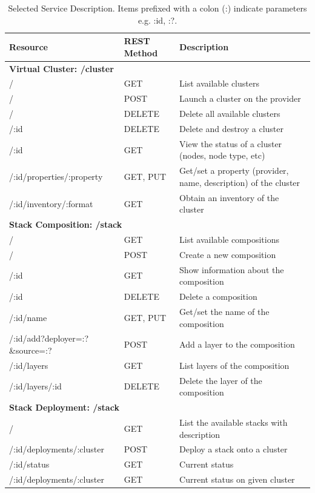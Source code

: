 \documentclass[9pt,twocolumn,twoside]{styles/osajnl}
\newcommand{\grey}{\cellcolor{lightgray}}  %
\newcommand{\blue}{\cellcolor{gray}}  %
\begin{document}
\begin{table}[htb]
  \bigskip
  \begin{center}
    \begin{small}
      \caption{Selected Service Description. Items prefixed with a colon (:) indicate parameters e.g. :id, :?.}
      \label{T:rest}
      \begin{tabular}{|l|l|l|}
        \hline
        \blue \textbf{Resource} & \blue \textbf{REST Method} & \blue \textbf{Description}\tabularnewline

\hline \multicolumn{3}{|l|}{\grey\bf Virtual Cluster: /cluster} \tabularnewline \hline
/                         & GET      & List available clusters \tabularnewline \hline
/                         & POST     & Launch a cluster on the provider \tabularnewline \hline
/                         & DELETE   & Delete all available clusters \tabularnewline \hline
/:id                      & DELETE   & Delete and destroy a cluster \tabularnewline \hline
/:id                      & GET      & View the status of a cluster (nodes, node type, etc) \tabularnewline \hline
/:id/properties/:property & GET, PUT & Get/set a property (provider, name, description) of the cluster \tabularnewline \hline
/:id/inventory/:format    & GET      & Obtain an inventory of the cluster \tabularnewline \hline

\hline \multicolumn{3}{|l|}{\grey\bf Stack Composition: /stack} \tabularnewline \hline
/                               & GET      & List available compositions \tabularnewline \hline
/                               & POST     & Create a new composition \tabularnewline \hline
/:id                            & GET      & Show information about the composition \tabularnewline \hline
/:id                            & DELETE   & Delete a composition \tabularnewline \hline
/:id/name                       & GET, PUT & Get/set the name of the composition \tabularnewline \hline
/:id/add?deployer=:?\&source=:? & POST     & Add a layer to the composition \tabularnewline \hline
/:id/layers                     & GET      & List layers of the composition \tabularnewline \hline
/:id/layers/:id                 & DELETE   & Delete the layer of the composition \tabularnewline \hline

\hline \multicolumn{3}{|l|}{\grey\bf Stack Deployment: /stack} \tabularnewline \hline
/                         & GET  & List the available stacks with description \tabularnewline \hline
/:id/deployments/:cluster & POST & Deploy a stack onto a cluster \tabularnewline \hline
/:id/status               & GET  & Current status \tabularnewline \hline
/:id/deployments/:cluster & GET  & Current status on given cluster \tabularnewline \hline


\end{tabular}
\end{small}
\end{center}
\end{table}
\end{document}
